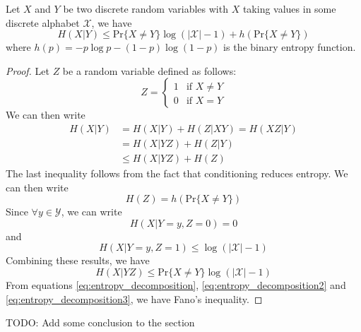 \begin{theorem}\label{thm:fano_inequality}
    Let $X$ and $Y$ be two discrete random variables with $X$ taking values in some discrete alphabet $\mathcal{X}$, we have
    \begin{equation}
        H(X|Y) \leq \text{Pr}\{X \neq Y\} \log (|\mathcal{X}|-1) + h(\text{Pr}\{X \neq Y\})
    \end{equation}
    where $h(p) = -p\log p - (1-p)\log(1-p)$ is the binary entropy function.
\end{theorem}
\begin{proof}
    Let $Z$ be a random variable defined as follows:
    \begin{equation}\label{eq:random_variable_Z}
        Z = \begin{cases}
            1 & \text{if } X \neq Y \\
            0 & \text{if } X = Y
        \end{cases}
    \end{equation}
    We can then write
    \begin{align} \label{eq:entropy_decomposition}
        H(X|Y) & = H(X|Y) + H(Z|XY) = H(XZ|Y) \nonumber \\
               & = H(X|YZ) + H(Z|Y) \nonumber           \\
               & \leq H(X|YZ) + H(Z)
    \end{align}
    The last inequality follows from the fact that conditioning reduces entropy. We can then write
    \begin{equation} \label{eq:entropy_decomposition2}
        H(Z) = h(\text{Pr}\{X \neq Y\})
    \end{equation}
    Since $\forall y \in \mathcal{Y}$, we can write
    \begin{equation}
        H(X | Y =y, Z =0) =0
    \end{equation}
    and
    \begin{equation}
        H(X| Y = y, Z = 1) \leq \log(|\mathcal{X}|-1)
    \end{equation}
    Combining these results, we have
    \begin{equation} \label{eq:entropy_decomposition3}
        H(X | YZ) \leq \text{Pr}\{X \neq Y\} \log (|\mathcal{X}|-1)
    \end{equation}
    From equations \ref{eq:entropy_decomposition}, \ref{eq:entropy_decomposition2} and \ref{eq:entropy_decomposition3}, we have Fano's inequality.
\end{proof}
TODO: Add some conclusion to the section
\clearpage
